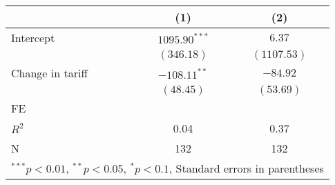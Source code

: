 
\begin{tabular}{l c c }
\hline
 & (1) & (2) \\
\hline
Intercept & $1095.90^{***}$ & $6.37$      \\
            & $(346.18)$      & $(1107.53)$ \\
Change in tariff     & $-108.11^{**}$  & $-84.92$    \\
            & $(48.45)$       & $(53.69)$   \\
\hline
FE          &                &                \\ 
\hline
$R^2$       & 0.04            & 0.37        \\
N           & 132             & 132         \\
\hline
\multicolumn{3}{l}{\scriptsize{$^{***}p<0.01$, $^{**}p<0.05$, $^*p<0.1$, Standard errors in parentheses}}
\end{tabular}

